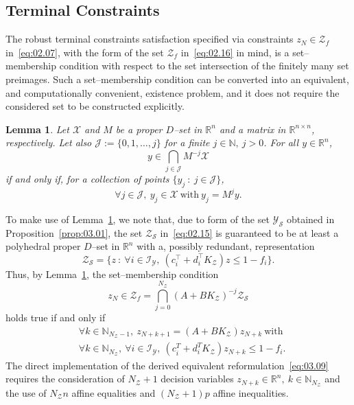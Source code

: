 \documentclass[twocolumn]{autart}
\newtheorem{lemma}{Lemma}
\newcommand{\mb}[1]{\mathbb{#1}}
\newcommand{\mc}[1]{\mathcal{#1}}
\newcommand{\N}{\mb{N}}
\newcommand{\R}{\mb{R}}
\newcommand{\Rnm}[2]{\R^{{#1}\times{#2}}}
\numberwithin{equation}{section}
\begin{document}
\subsection{Terminal Constraints}
\label{sec:03.05}
The robust terminal constraints satisfaction specified via constraints $z_N\in\mc{Z}_f$ in~\eqref{eq:02.07}, with the form of the set $\mc{Z}_f$ in~\eqref{eq:02.16} in mind, is a set--membership condition with respect to the set intersection of the finitely many set preimages. Such a set--membership condition can be converted into an equivalent, and computationally convenient, existence problem, and it does not require the considered set to be constructed explicitly.
\begin{lemma}
\label{lemma:03.03}
Let $\mc{X}$ and $M$ be a proper $D$--set in $\R^n$ and a matrix in $\Rnm{n}{n}$, respectively. Let also $\mc{J}:=\{0,1,\ldots,j\}$ for a finite $j\in\N,\ j>0$.  For all $y\in\R^n$, 
\begin{equation*}
y\in \bigcap_{j\in\mc{J}} M^{-j}\mc{X}
\end{equation*}
if and only if, for a collection of points $\{y_j\ :\ j\in\mc{J}\}$, 
\begin{equation*}
\forall j\in\mc{J},\  y_j\in\mc{X}\ \text{with}\  y_j=M^jy.
\end{equation*}
\end{lemma}
To make use of Lemma~\ref{lemma:03.03}, we note that, due to form of the set $\mc{Y}_\mc{S}$ obtained in Proposition~\ref{prop:03.01}, the set $\mc{Z}_\mc{S}$ in~\eqref{eq:02.15} is guaranteed to be at least a polyhedral proper $D$--set in  $\R^n$ with a, possibly redundant, representation
\begin{equation}
\label{eq:03.07}
\mc{Z}_\mc{S}=\{z\ :\ \forall i\in\mc{I}_\mc{Y},\  (c_i^\top + d_i^\top K_\mc{Z})z \le 1-f_i\}.
\end{equation}  
Thus, by Lemma~\ref{lemma:03.03}, the set--membership condition
\begin{equation}
\label{eq:03.08}
z_N\in \mc{Z}_f=\bigcap_{j=0}^{N_\mc{Z}}(A+BK_\mc{Z})^{-j}\mc{Z}_\mc{S}
\end{equation} 
holds true if and only if
\begin{align}
&\forall k\in\N_{N_\mc{Z}-1},\  z_{N+k+1}=(A+BK_\mc{Z})z_{N+k}\  \text{with}\nonumber\\
\label{eq:03.09}
&\forall k\in\N_{N_\mc{Z}},\  \forall i\in\mc{I}_\mc{Y},\  (c_i^T+d_i^TK_\mc{Z})z_{N+k}\le 1-f_i.
\end{align}
The direct implementation of the derived equivalent reformulation~\eqref{eq:03.09} requires the consideration of $N_\mc{Z}+1$ decision variables $z_{N+k}\in\R^n,\ k\in\N_{N_\mc{Z}}$ and the use of $N_\mc{Z}n$ affine equalities and $(N_\mc{Z}+1)p$ affine inequalities.  
\end{document}

